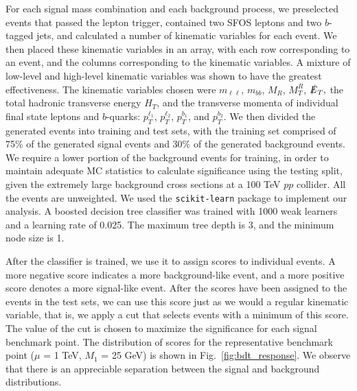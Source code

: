 \documentclass[a4paper,11pt]{article}
\begin{document}
For each signal mass combination and each background process, we preselected
events that passed the lepton trigger, contained two SFOS leptons and two
$b$-tagged jets, and calculated a number of kinematic variables for each event.   We then
placed these kinematic variables in an array, with each row corresponding to an
event, and the columns corresponding to the kinematic variables. A mixture of
low-level and high-level kinematic variables was shown to have the greatest
effectiveness. The kinematic variables chosen were $m_{\ell\ell}$, $m_{bb}$,
$M_R$, $M_T^R$, $\slashed{E}_T,$ the total hadronic transverse energy $H_T$,
and the transverse momenta of individual final state leptons and $b$-quarks:
$p_T^{\ell_1}$, $p_T^{\ell_2}$, $p_T^{b_1}$, and $p_T^{b_2}$. We then divided
the generated events into training and test sets, with the training set
comprised of 75\% of the generated signal events and 30\% of the generated
background events. We require a lower portion of the background events for
training, in order to maintain adequate MC statistics to calculate significance
using the testing split, given the extremely large background cross sections at
a 100 TeV $pp$ collider. All the events are unweighted. We used the
\texttt{scikit-learn} package  \cite{Pedregosa2011} to implement our analysis.
A boosted decision tree classifier was trained with 1000 weak learners and a
learning rate of 0.025. The maximum tree depth is 3, and the minimum node
size is 1.

After the classifier is trained, we use it to assign scores to individual
events. A more negative score indicates a more background-like event, and a
more positive score denotes a more signal-like event. After the scores have
been assigned to the events in the test sets, we can use this score just as we
would a regular kinematic variable, that is, we apply a cut that selects
events with a minimum of this score. The value of the cut is chosen to maximize
the significance for each signal benchmark point. The distribution of scores
for the representative benchmark point ($\mu$ = 1 TeV, $M_1$ = 25 GeV) is shown in Fig.~\ref{fig:bdt_response}. We observe that there is an appreciable
separation between the signal and background distributions.
\end{document}
